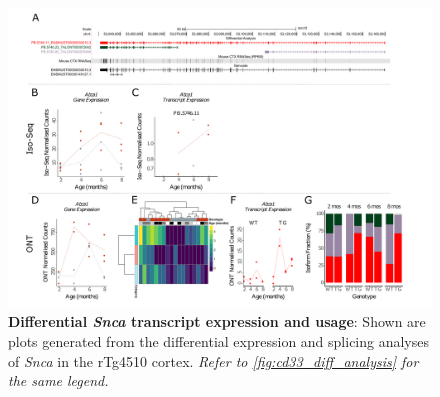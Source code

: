 \begin{landscape}
	\begin{figure}[htp]
		\begin{center}
			\includegraphics[page=15,trim={0 0.5cm 0 1.5cm},scale =0.85]{Figures/TargetGene_DifferentialAnalysis.pdf}
		\end{center}
		\captionsetup{width=1.5\textwidth}
		\caption[Differential \textit{Snca} transcript expression and usage]%
		{\textbf{Differential \textit{Snca} transcript expression and usage}: Shown are plots generated from the differential expression and splicing analyses of \textit{Snca} in the rTg4510 cortex. \textit{Refer to \cref{fig:cd33_diff_analysis} for the same legend.}}   
		\label{fig:Snca_diff_analysis}
	\end{figure}
\end{landscape}

